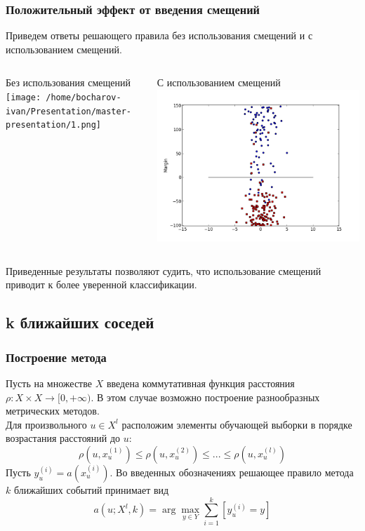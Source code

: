 \documentclass{beamer}
\begin{document}
\begin{frame}
\frametitle{Положительный эффект от введения смещений}
Приведем ответы решающего правила без использования смещений и с использованием смещений.
 \begin{columns}[T]
    \begin{column}{.5\textwidth}
    \begin{block}{Без использования смещений}
    \texttt{[image: /home/bocharov-ivan/Presentation/master-presentation/1.png]}
    \end{block}
    \end{column}
    \begin{column}{.5\textwidth}
    \begin{block}{С использованием смещений}
    \includegraphics[width=\linewidth,height=\textheight,keepaspectratio]{2.png}
    \end{block}
    \end{column}
  \end{columns}
Приведенные результаты позволяют судить, что использование смещений приводит к более уверенной классификации.
\end{frame}


\subsection{k ближайших соседей}
\begin{frame}
\frametitle{Построение метода}
Пусть на множестве $X$ введена коммутативная функция расстояния $\rho:X\times X\rightarrow[0,+\infty)$. В этом случае возможно построение разнообразных метрических методов.\\
Для произвольного $u\in X^l$ расположим элементы обучающей выборки в порядке возрастания расстояний до $u$:
$$\rho(u,x_u^{(1)})\le\rho(u,x_u^{(2)})\le ... \le \rho(u, x_u^{(l)})$$
Пусть $y_u^{(i)}=a(x_u^{(i)})$. Во введенных обозначениях решающее правило метода $k$ ближайших событий принимает вид $$a(u; X^l, k)=\arg\max\limits_{y \in Y}\sum\limits_{i=1}^{k}[y_u^{(i)}=y]$$
\end{frame} 
\end{document}
